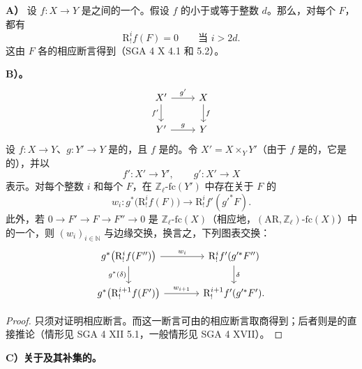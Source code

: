 \textbf{A）} 设 $f:X\to Y$ 是之间的一个。假设 $f$ 的小于或等于整数 $d$。那么，对每个 $F$，都有
\[
\mathrm R^i_{!}f(F)=0\qquad\text{当 }i>2d.
\]
这由 $F$ 各的相应断言得到（SGA 4 X 4.1 和 5.2）。

\textbf{B）。}
\[
\begin{tikzcd}
X'\arrow[r,"g'"]\arrow[d,"f'"']&X\arrow[d,"f"]\\
Y'\arrow[r,"g"]&Y
\end{tikzcd}
\]
设 $f:X\to Y$、$g:Y'\to Y$ 是的，且 $f$ 是的。令 $X'=X\times_Y Y'$（由于 $f$ 是的，它是的），并以
\[
f':X'\longrightarrow Y',\qquad g':X'\longrightarrow X
\]
表示。对每个整数 $i$ 和每个 $F$，在 $\mathbb Z_\ell\text{-}\mathrm{fc}(Y')$ 中存在关于 $F$ 的
\[
w_i:g^*\bigl(\mathrm R^i_{!}f(F)\bigr)\longrightarrow
\mathrm R^i_{!}f'(g'^*F).
\]
此外，若 $0\to F'\to F\to F''\to0$ 是 $\mathbb Z_\ell\text{-}\mathrm{fc}(X)$（相应地，$(\mathrm{AR},\mathbb Z_\ell)\text{-}\mathrm{fc}(X)$）中的一个，则 $(w_i)_{i\in\mathbb N}$ 与边缘交换，换言之，下列图表交换：
\[
\begin{tikzcd}[column sep=large]
g^*\bigl(\mathrm R^i_{!}f(F'')\bigr)\arrow[r,"w_i"]\arrow[d,"g^*(\delta)"']&
\mathrm R^i_{!}f'(g'^*F'')\arrow[d,"\delta"]\\
g^*\bigl(\mathrm R^{i+1}_{!}f(F')\bigr)\arrow[r,"w_{i+1}"]&
\mathrm R^{i+1}_{!}f'(g'^*F').
\end{tikzcd}
\]
\begin{proof}
只须对证明相应断言。而这一断言可由的相应断言取商得到；后者则是的直接推论（情形见 SGA 4 XII 5.1，一般情形见 SGA 4 XVII）。
\end{proof}
\textbf{C）关于及其补集的。}
